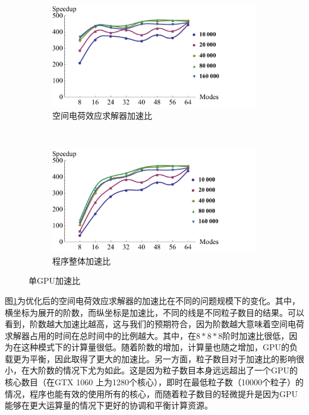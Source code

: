 \begin{figure}[!htb]
    \centering
    \begin{subfigure}[b]{0.9\textwidth}
        \includegraphics[width=\textwidth]{plot/SpaceChargeGPU11th_large.pdf}
        \caption{空间电荷效应求解器加速比}
        \label{fig:SCOpt}
    \end{subfigure}
    \quad
    ~ %
    \begin{subfigure}[b]{0.9\textwidth}
        \includegraphics[width=\textwidth]{plot/TotalGPU11th_large.pdf}
        \caption{程序整体加速比}
        \label{fig:TotalOpt}
    \end{subfigure}
    \caption{单GPU加速比}\label{fig:OneGPU}
\end{figure}

图\ref{fig:SCOpt}为优化后的空间电荷效应求解器的加速比在不同的问题规模下的变化。其中，横坐标为展开的阶数，而纵坐标是加速比，不同的线是不同粒子数目的结果。可以看到，阶数越大加速比越高，这与我们的预期符合，因为阶数越大意味着空间电荷求解器占用的时间在总时间中的比例越大。其中，在$8*8*8$阶时加速比很低，因为在这种模式下的计算量很低。随着阶数的增加，计算量也随之增加，GPU的负载更为平衡，因此取得了更大的加速比。另一方面，粒子数目对于加速比的影响很小，在大阶数的情况下尤为如此。这是因为粒子数目本身远远超出了一个GPU的核心数目（在GTX 1060 上为1280个核心），即时在最低粒子数（10000个粒子）的情况，程序也能有效的使用所有的核心，而随着粒子数目的轻微提升是因为GPU能够在更大运算量的情况下更好的协调和平衡计算资源。


